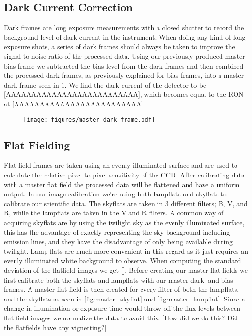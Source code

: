 \documentclass[twocolumn]{aastex631}
\begin{document}
\subsection{Dark Current Correction}
\label{subsec:darks}
Dark frames are long exposure measurements with a closed shutter to record the background level of dark current in the instrument. When doing any kind of long exposure shots, a series of dark frames should always be taken to improve the signal to noise ratio of the processed data. Using our previously produced master bias frame we subtracted the bias level from the dark frames and then combined the processed dark frames, as previously explained for bias frames, into a master dark frame seen in \ref{fig:master_dark}. We find the dark current of the detector to be [AAAAAAAAAAAAAAAAAAAAAAAAAA], which becomes equal to the RON at [AAAAAAAAAAAAAAAAAAAAAAAAA].
\begin{figure}[ht!]
    \begin{centering}
        \texttt{[image: figures/master\_dark\_frame.pdf]}
        \caption{}
        \label{fig:master_dark}
    \end{centering}
\end{figure}

\subsection{Flat Fielding}
\label{subsec:flats}
Flat field frames are taken using an evenly illuminated surface and are used to calculate the relative pixel to pixel sensitivity of the CCD. After calibrating data with a master flat field the processed data will be flattened and have a uniform output. In our image calibration we're using both lampflats and skyflats to calibrate our scientific data. The skyflats are taken in 3 different filters; B, V, and R, while the lampflats are taken in the V and R filters. A common way of acquiring skyflats are by using the twilight sky as the evenly illuminated surface, this has the advantage of exactly representing the sky background including emission lines, and they have the disadvantage of only being available during twilight. Lamp flats are much more convenient in this regard as it just requires an evenly illuminated white background to observe. When computing the standard deviation of the flatfield images we get []. Before creating our master flat fields we first calibrate both the skyflats and lampflats with our master dark, and bias frames. A master flat field is then created for every filter of both the lampflats, and the skyflats as seen in \ref{fig:master_skyflat} and \ref{fig:master_lampflat}. Since a change in illumination or exposure time would throw off the flux levels between flat field images we normalize the data to avoid this. [How did we do this? Did the flatfields have any vignetting?]
\end{document}
